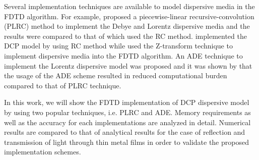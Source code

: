 Several implementation techniques are available to model dispersive media in the FDTD algorithm. For example, \citet{kelley_piecewise_1996} proposed a piecewise-linear recursive-convolution (PLRC) method to implement the Debye and Lorentz dispersive media and the results were compared to that of \citet{luebbers_fdtd_1993} which used the RC method. \citet{vial_implementation_2007} implemented the DCP model by using RC method while \citet{sullivan_electromagnetic_2000, weedon_general_1997} used the Z-transform technique to implement dispersive media into the FDTD algorithm. An ADE technique to implement the Lorentz dispersive model was proposed \cite{joseph_direct_1991} and it was shown by \citet{okoniewski_simple_1997} that the usage of the ADE scheme resulted in reduced computational burden compared to that of PLRC technique. 

In this work, we will show the FDTD implementation of DCP dispersive model by using two popular techniques, i.e. PLRC and ADE. Memory requirements as well as the accuracy for each implementations are analyzed in detail. Numerical results are compared to that of analytical results for the case of reflection and transmission of light through thin metal films in order to validate the proposed implementation schemes.  

